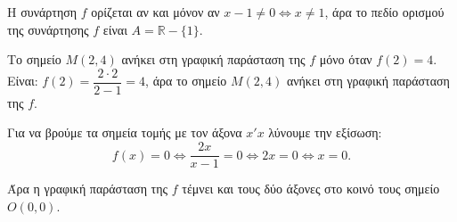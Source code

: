 
\begin{alist}
\item Η συνάρτηση $f$ ορίζεται αν και μόνον αν $x - 1 \ne 0 \Leftrightarrow x \ne 1$, άρα το πεδίο ορισμού της συνάρτησης $f$ είναι $A = \mathbb{R} - \{1\}$.

\item Το σημείο $M(2,4)$ ανήκει στη γραφική παράσταση της $f$ μόνο όταν $f(2) = 4$.
Είναι: $f(2) = \dfrac{2 \cdot 2}{2-1} = 4$, άρα το σημείο $M(2,4)$ ανήκει στη γραφική παράσταση της $f$.

\item Για να βρούμε τα σημεία τομής με τον άξονα $x'x$ λύνουμε την εξίσωση:
\[f(x) = 0 \Leftrightarrow \dfrac{2x}{x-1} = 0 \Leftrightarrow 2x = 0 \Leftrightarrow x = 0.\]

Άρα η γραφική παράσταση της $f$ τέμνει και τους δύο άξονες στο κοινό τους σημείο $O(0,0)$.
\end{alist}

